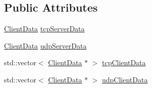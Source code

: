 \subsection*{Public Attributes}
\begin{DoxyCompactItemize}
\item 
\hyperlink{structClientData}{Client\-Data} \hyperlink{classNetManager_abca113fc17fe6251fa7ac5a1179ade3c}{tcp\-Server\-Data}
\item 
\hyperlink{structClientData}{Client\-Data} \hyperlink{classNetManager_a7db7fafed8aabbe088aa12c731842efd}{udp\-Server\-Data}
\item 
std\-::vector$<$ \hyperlink{structClientData}{Client\-Data} $\ast$ $>$ \hyperlink{classNetManager_a3303746abef87426cab748c92d58006b}{tcp\-Client\-Data}
\item 
std\-::vector$<$ \hyperlink{structClientData}{Client\-Data} $\ast$ $>$ \hyperlink{classNetManager_a687d70a4e199c2cbe4cb955a2cd94b04}{udp\-Client\-Data}
\end{DoxyCompactItemize}
